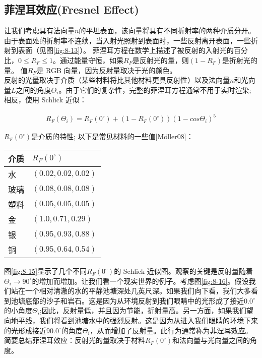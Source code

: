 \subsection{菲涅耳效应(Fresnel Effect)}
\begin{flushleft}
让我们考虑具有法向量$n$的平坦表面，该向量将具有不同折射率的两种介质分开。 由于表面处的折射率不连续，当入射光照射到表面时，一些反射离开表面，一些折射到表面（见图\ref{fig:8-13}）。 菲涅耳方程在数学上描述了被反射的入射光的百分比，$0\leq R_{F} \leq 1$。通过能量守恒，如果$R_{F}$是反射光的量，则$(1-R_{F})$是折射光的量。 值$R_{F}$是 RGB 向量，因为反射量取决于光的颜色。\\
反射的光量取决于介质（某些材料将比其他材料更具反射性）以及法向量$n$和光向量$L$之间的角度$\Theta_{i}$。由于它们的复杂性，完整的菲涅耳方程通常不用于实时渲染; 相反，使用 Schlick 近似：\\
\end{flushleft}

\begin{align*}
R_{F}(\Theta_{i})=R_{F}(0^{\circ})+(1-R_{F}(0^{\circ}))(1-cos\Theta_{i})^{5} 
\end{align*}

\begin{flushleft}
$R_{F}(0^{\circ})$是介质的特性; 以下是常见材料的一些值[Möller08]：\\
\end{flushleft}

\begin{tabular}{|p{5em}|p{35em}|} 
\hline
介质 & $R_{F}(0^{\circ})$\\ 
\hline
水 & $(0.02,0.02,0.02)$\\ 
\hline
玻璃 & $(0.08,0.08,0.08)$\\ 
\hline
塑料 & $(0.05,0.05,0.05)$\\ 
\hline
金 & $(1.0,0.71,0.29)$\\ 
\hline
银 & $(0.95,0.93,0.88)$\\ 
\hline
铜 & $(0.95,0.64,0.54)$\\ 
\hline
\end{tabular}

\begin{flushleft}
图\ref{fig:8-15}显示了几个不同$R_{F}(0^{\circ})$的 Schlick 近似图。观察的关键是反射量随着$\Theta_{i}\rightarrow 90^{\circ}$的增加而增加。让我们看一个现实世界的例子。考虑图\ref{fig:8-16}。假设我们站在一个相对清澈的水的平静池塘深处几英尺深。如果我们向下看，我们大多看到池塘底部的沙子和岩石。这是因为从环境反射到我们眼睛中的光形成了接近$0.0^{\circ}$的小角度$\Theta_{i}$;因此，反射量低，并且因为节能，折射量高。另一方面，如果我们望向地平线，我们将看到池塘水中的强烈反射。这是因为从进入我们眼睛的环境下来的光形成接近$90.0^{\circ}$的角度$\Theta_{i}$，从而增加了反射量。此行为通常称为菲涅耳效应。简要总结菲涅耳效应：反射光的量取决于材料$R_{F}(0^{\circ})$和法向量与光向量之间的角度。\\
\end{flushleft}

